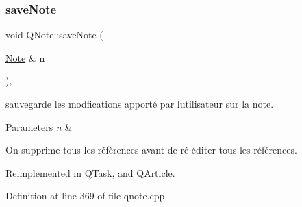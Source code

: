 \subsubsection{\texorpdfstring{save\+Note}{saveNote}}
{\footnotesize\ttfamily void Q\+Note\+::save\+Note (\begin{DoxyParamCaption}\item[{\hyperlink{class_note}{Note} \&}]{n }\end{DoxyParamCaption})\hspace{0.3cm}{\ttfamily [virtual]}, {\ttfamily [slot]}}



sauvegarde les modfications apporté par l\textquotesingle{}utilisateur sur la note. 


\begin{DoxyParams}{Parameters}
{\em n} & \\
\hline
\end{DoxyParams}
On supprime tous les réfèrences avant de ré-\/éditer tous les références. 

Reimplemented in \hyperlink{class_q_task_ae304b097cdfd1169d2b190bbad3922eb}{Q\+Task}, and \hyperlink{class_q_article_ae59d03688947d16b86f9ab10384894ec}{Q\+Article}.



Definition at line 369 of file qnote.\+cpp.

